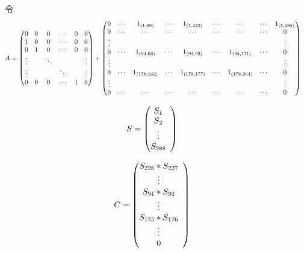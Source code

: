 令
\begin{align}
\label{eq:struct_A}
& A = \left(
\begin{array}{@{}*{6}{c}@{}}
0 & 0 & 0 & \cdots & 0 & 0 \\
1 & 0 & 0 & \cdots & 0 & 0 \\
0 & 1 & 0 & \cdots & 0 & 0 \\
\vdots & & \ddots & & & \vdots \\
\vdots & & & \ddots & & \vdots \\
0 & 0 & 0 & \cdots & 1 & 0 \\
\end{array}
\right)+\left(
\begin{array}{@{}*{9}{c}@{}}
0 & \cdots & 1_{(1,69)} & \cdots & 1_{(1,243)} & \cdots & \cdots & \cdots & 1_{(1,288)} \\
0 & \cdots & \cdots & \cdots & \cdots & \cdots & \cdots & \cdots & 0 \\
\vdots & & & & & & & & \vdots \\
0 & \cdots & 1_{(94,66)} & \cdots & 1_{(94,93)} & \cdots & 1_{(94,171)} & \cdots & 0 \\
\vdots & & & & & & & & \vdots \\
0 & \cdots & 1_{(178,162)} & \cdots & 1_{(178,177)} & \cdots & 1_{(178,264)} & \cdots & 0 \\
\vdots & & & & & & & & \vdots \\
0 & \cdots & \cdots & \cdots & \cdots & \cdots & \cdots & \cdots & 0 \\
\end{array}
\right)
\end{align}

\begin{align}
\label{eq:struct_S}
& S = \left(
\begin{array}{@{}*{6}{c}@{}}
S_{1} \\
S_{2} \\
\vdots \\
S_{288} \\
\end{array}
\right)
\end{align}

\begin{align}
\label{eq:struct_C}
& C = \left(
\begin{array}{@{}*{6}{c}@{}}
S_{226} * S_{227} \\
\vdots \\
S_{91} * S_{92} \\
\vdots \\
S_{175} * S_{176} \\
\vdots \\
0 \\
\end{array}
\right)
\end{align}

